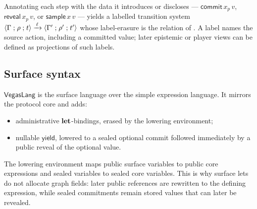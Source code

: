 \begin{remark}
Annotating each step with the data it introduces or discloses ---
\(\mathsf{commit}\,x_p\,v\), \(\mathsf{reveal}\,x_p\,v\), or
\(\mathsf{sample}\,x\,v\) --- yields a labelled transition system
\(\langle \Gamma \mathrel{;} \rho \mathrel{;} t \rangle \xrightarrow{\,\ell\,} \langle \Gamma' \mathrel{;} \rho' \mathrel{;} t' \rangle\) whose
label-erasure is the relation of .  A label names the
source action, including a committed value; later epistemic or player
views can be defined as projections of such labels.
\end{remark}


\subsection{Surface syntax}
\label{sec:source:surface}

\(\mathsf{VegasLang}\) is the surface language over the simple
expression language.  It mirrors the protocol core and adds:
\begin{itemize}\itemsep1pt
\item administrative \(\mathbf{let}\)-bindings, erased by the lowering
  environment;
\item nullable \(\mathsf{yield}\), lowered to a sealed optional commit
  followed immediately by a public reveal of the optional value.
\end{itemize}

The lowering environment maps public surface variables to public core
expressions and sealed variables to sealed core variables.  This is why
surface lets do not allocate graph fields: later public references are
rewritten to the defining expression, while sealed commitments remain
stored values that can later be revealed.

